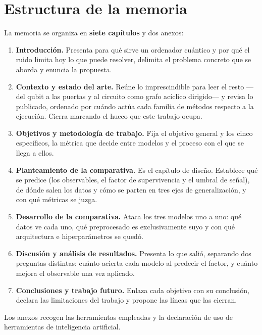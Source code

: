 \section{Estructura de la memoria}
\label{sec:estructura}
%
%

La memoria se organiza en \textbf{siete capítulos} y dos anexos:

\begin{enumerate}
    \item \textbf{Introducción.} Presenta para qué sirve un ordenador cuántico y por qué el
          ruido limita hoy lo que puede resolver, delimita el problema concreto que se aborda y
          enuncia la propuesta.

    \item \textbf{Contexto y estado del arte.} Reúne lo imprescindible para leer el resto —del
          qubit a las puertas y al circuito como grafo acíclico dirigido— y revisa lo publicado,
          ordenado por cuándo actúa cada familia de métodos respecto a la ejecución. Cierra
          marcando el hueco que este trabajo ocupa.

    \item \textbf{Objetivos y metodología de trabajo.} Fija el objetivo general y los cinco
          específicos, la métrica que decide entre modelos y el proceso con el que se llega a
          ellos.

    \item \textbf{Planteamiento de la comparativa.} Es el capítulo de diseño. Establece qué se
          predice (los observables, el factor de supervivencia y el umbral de señal), de dónde
          salen los datos y cómo se parten en tres ejes de generalización, y con qué métricas se
          juzga.

    \item \textbf{Desarrollo de la comparativa.} Ataca los tres modelos uno a uno: qué datos ve
          cada uno, qué preprocesado es exclusivamente suyo y con qué arquitectura e
          hiperparámetros se quedó.

    \item \textbf{Discusión y análisis de resultados.} Presenta lo que salió, separando dos
          preguntas distintas: cuánto acierta cada modelo al predecir el factor, y cuánto mejora
          el observable una vez aplicado.

    \item \textbf{Conclusiones y trabajo futuro.} Enlaza cada objetivo con su conclusión, declara
          las limitaciones del trabajo y propone las líneas que las cierran.
\end{enumerate}

Los anexos recogen las herramientas empleadas y la declaración de uso de herramientas de
inteligencia artificial.
